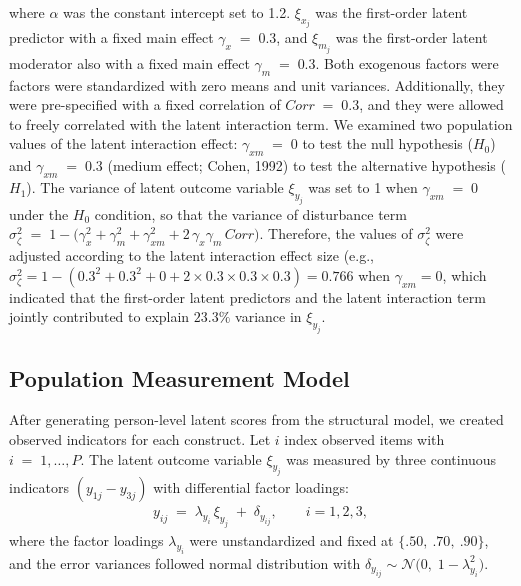 \documentclass[
  man]{apa6}
\begin{document}
where \(\alpha\) was the constant intercept set to 1.2. \(\xi_{x_{j}}\) was
the first-order latent predictor with a fixed main effect
\(\gamma_{x} \;=\; 0.3\), and \(\xi_{m_{j}}\) was the first-order latent
moderator also with a fixed main effect \(\gamma_{m} \;=\; 0.3\). Both
exogenous factors were factors were standardized with zero means and
unit variances. Additionally, they were pre-specified with a fixed
correlation of \(Corr \;=\; 0.3\), and they were allowed to freely correlated with the latent interaction term. We examined two population values of
the latent interaction effect: \(\gamma_{xm} \;=\; 0\) to test the null
hypothesis (\(H_{0}\)) and \(\gamma_{xm} \;=\; 0.3\) (medium effect; Cohen,
1992) to test the alternative hypothesis (\(H_{1}\)). The variance of
latent outcome variable \(\xi_{y_{j}}\) was set to 1 when
\(\gamma_{xm} \;=\; 0\) under the \(H_{0}\) condition, so that the variance
of disturbance term
\(\sigma^2_{\zeta} \;=\; 1 - \big(\gamma_x^2 + \gamma_m^2 + \gamma_{xm}^2 + 2\,\gamma_x\gamma_m\,Corr \big)\).
Therefore, the values of \(\sigma^2_{\zeta}\) were adjusted according to
the latent interaction effect size (e.g.,
\(\sigma_\zeta^2 = 1 - \left(0.3^2 + 0.3^2 + 0 + 2 \times 0.3 \times 0.3 \times 0.3\right) = 0.766\)
when \(\gamma_{xm} = 0\), which indicated that the first-order latent
predictors and the latent interaction term jointly contributed to
explain \(23.3\%\) variance in \(\xi_{y_{j}}\).

\subsection{Population Measurement Model}\label{population-measurement-model}

After generating person-level latent scores from the structural model, we created observed indicators for each construct. Let \(i\) index observed items with \(i \;=\; 1,\ldots, P\). The latent outcome variable \(\xi_{y_j}\) was measured by three continuous indicators \((y_{1j} -y_{3j})\) with differential factor loadings:
\begin{align}
y_{ij} \;=\; \lambda_{y_{i}}\,\xi_{y_{j}} \;+\; \delta_{y_{ij}},
\qquad i = 1,2,3,
\end{align}
where the factor loadings \(\lambda_{y_{i}}\) were unstandardized and fixed at \(\{.50,\ .70,\ .90\}\), and the error variances followed normal distribution with \(\delta_{y_{ij}}\sim\mathcal{N}\!\big(0,\;1-\lambda_{y_i}^{2}\big)\).
\end{document}
